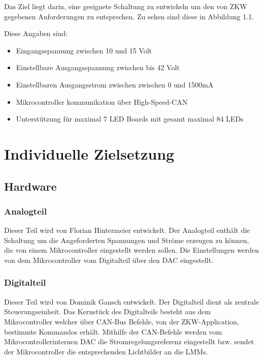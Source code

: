 \documentclass[paper=a4, 12pt]{scrreprt}
\begin{document}
	Das Ziel liegt darin, eine geeignete Schaltung zu entwickeln um den von ZKW gegebenen Anforderungen zu entsprechen. Zu sehen sind diese in Abbildung 1.1.
	
	Diese Angaben sind:
	\begin{itemize}
		\item{Eingangsspannung zwischen 10 und 15 Volt}
		\item{Einstellbare Ausgangsspannung zwischen bis 42 Volt}
		\item{Einstellbaren Ausgangsstrom zwischen zwischen 0 und 1500mA}
		\item{Mikrocontroller kommunikation über High-Speed-CAN}
		\item{Unterstützung für maximal 7 LED Boards mit gesamt maximal 84 LEDs}
	\end{itemize}
	

\chapter{Individuelle Zielsetzung}
    \section{Hardware}    	
    	\subsection{Analogteil}
        Dieser Teil wird von Florian Hintermeier entwickelt. Der Analogteil enthält die Schaltung um die Angeforderten Spannungen und Ströme erzeugen zu können, die von einem Mikrocontroller eingestellt werden sollen. Die Einstellungen werden von dem Mikrocontroller vom Digitalteil über den DAC eingestellt.
        
        \subsection{Digitalteil}
        Dieser Teil wird von Dominik Gansch entwickelt. Der Digitalteil dient als zentrale Steuerungseinheit. Das Kernstück des Digitalteils besteht aus dem Mikrocontroller welcher über CAN-Bus Befehle, von der ZKW-Application, bestimmte Kommandos erhält. Mithilfe der  CAN-Befehle werden vom Mikrocontrollerinternen DAC die Stromregelungsreferenz eingestellt bzw. sendet der Mikrocontroller die entsprechenden Lichtbilder an die LMMs.%
\end{document}
